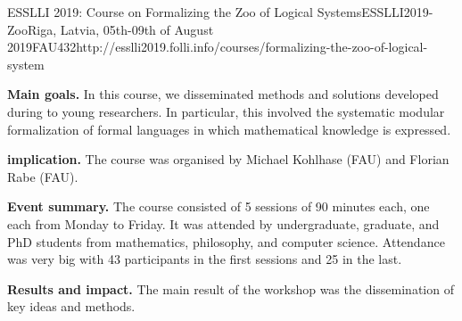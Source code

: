 \begin{event}{ESSLLI 2019: Course on Formalizing the Zoo of Logical Systems}{ESSLLI2019-Zoo}{Riga, Latvia, 05th-09th of August 2019}{FAU}{43}{2}{http://esslli2019.folli.info/courses/formalizing-the-zoo-of-logical-system}

\textbf{Main goals.}
In this course, we disseminated methods and solutions developed during \ODK to young researchers.
In particular, this involved the systematic modular formalization of formal languages in which mathematical knowledge is expressed.

\textbf{\ODK implication.}
The course was organised by Michael Kohlhase (FAU) and Florian Rabe (FAU).

\textbf{Event summary.}
The course consisted of 5 sessions of 90 minutes each, one each from Monday to Friday.
It was attended by undergraduate, graduate, and PhD students from mathematics, philosophy, and computer science.
Attendance was very big with 43 participants in the first sessions and 25 in the last.

\textbf{Results and impact.}
The main result of the workshop was the dissemination of key \ODK ideas and methods.
\end{event}
